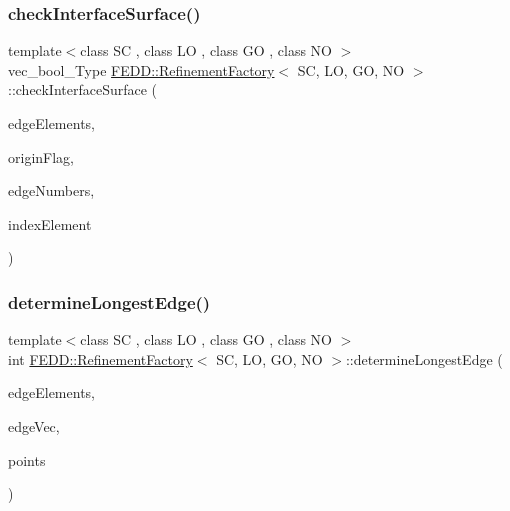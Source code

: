 \subsubsection{\texorpdfstring{check\+Interface\+Surface()}{checkInterfaceSurface()}}
{\footnotesize\ttfamily template$<$class SC , class LO , class GO , class NO $>$ \\
vec\+\_\+bool\+\_\+\+Type \hyperlink{classFEDD_1_1RefinementFactory}{F\+E\+D\+D\+::\+Refinement\+Factory}$<$ SC, LO, GO, NO $>$\+::check\+Interface\+Surface (\begin{DoxyParamCaption}\item[{\hyperlink{classFEDD_1_1RefinementFactory_ae5285e990ec4632d6188a1280627ad13}{Edge\+Elements\+Ptr\+\_\+\+Type}}]{edge\+Elements,  }\item[{vec\+\_\+int\+\_\+\+Type}]{origin\+Flag,  }\item[{vec\+\_\+int\+\_\+\+Type}]{edge\+Numbers,  }\item[{int}]{index\+Element }\end{DoxyParamCaption})}

\mbox{\label{classFEDD_1_1RefinementFactory_a383adbeffceada793b6805fb02fa5568}} 
\subsubsection{\texorpdfstring{determine\+Longest\+Edge()}{determineLongestEdge()}}
{\footnotesize\ttfamily template$<$class SC , class LO , class GO , class NO $>$ \\
int \hyperlink{classFEDD_1_1RefinementFactory}{F\+E\+D\+D\+::\+Refinement\+Factory}$<$ SC, LO, GO, NO $>$\+::determine\+Longest\+Edge (\begin{DoxyParamCaption}\item[{\hyperlink{classFEDD_1_1RefinementFactory_ae5285e990ec4632d6188a1280627ad13}{Edge\+Elements\+Ptr\+\_\+\+Type}}]{edge\+Elements,  }\item[{vec\+\_\+int\+\_\+\+Type}]{edge\+Vec,  }\item[{vec2\+D\+\_\+dbl\+\_\+ptr\+\_\+\+Type}]{points }\end{DoxyParamCaption})}

\mbox{\label{classFEDD_1_1RefinementFactory_aecc0c9142abed8227daa43fc5db6ae1c}} 
